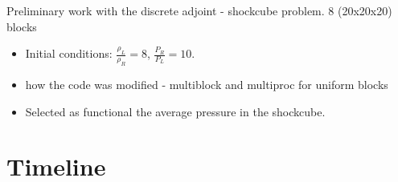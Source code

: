 \documentclass{beamer}
\begin{document}
\begin{frame}
\begin{minipage}[t][1\textheight]{1\textwidth}
\begin{exampleblock}{Preliminary work with the discrete adjoint - shockcube problem. 8 (20x20x20) blocks}
\begin{figure}
\end{figure}
\vspace{-10pt}
\begin{itemize}
\scriptsize
\item Initial conditions: $\frac{\rho_L}{\rho_R} = 8$, $\frac{P_R}{P_L} = 10$. 
\item how the code was modified - multiblock and multiproc for uniform blocks
\item Selected as functional the average pressure in the shockcube.

\end{itemize}

\end{exampleblock}
\end{minipage}

\end{frame}


\section[Timeline]{Timeline}
\end{document}
